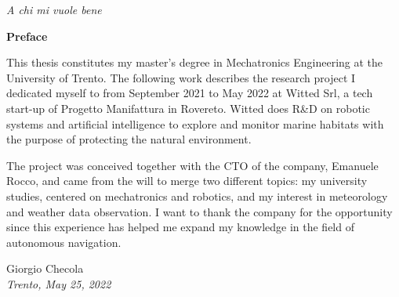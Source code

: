 \documentclass[12pt,a4paper,twoside, openright]{book}
\begin{document}

\pagestyle{empty}

\clearpage
\null
\clearpage

\restoregeometry

\begin{flushright}
\null {}
\emph{A chi mi vuole bene}
\null
\end{flushright}

\clearpage
\null
\clearpage

\frontmatter
{}
\pagestyle{plain}
\begin{flushleft}
	\textbf{\Large{Preface}}
\end{flushleft}

\noindent
This thesis constitutes my master's degree in Mechatronics Engineering at the University of Trento. 
The following work describes the research project I dedicated myself to from September 2021 to May 2022 at Witted Srl, a tech start-up of Progetto Manifattura in Rovereto. Witted does R\&D on robotic systems and artificial intelligence to explore and monitor marine habitats with the purpose of protecting the natural environment.

The project was conceived together with the CTO of the company, Emanuele Rocco, and came from the will to merge two different topics: my university studies, centered on mechatronics and robotics, and my interest in meteorology and weather data observation. I want to thank the company for the opportunity since this experience has helped me expand my knowledge in the field of autonomous navigation.


\vspace{4cm}
\begin{center}
	Giorgio Checola \\
	\textit{Trento, May 25, 2022}
\end{center}

\clearpage
\null
\thispagestyle{empty}
\clearpage
\end{document}
